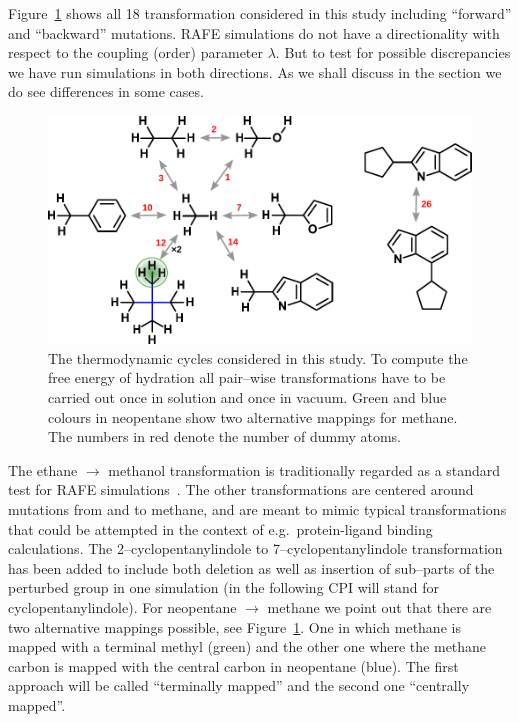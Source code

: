 \documentclass[journal=jctcce,manuscript=article]{achemso}
\begin{document}
Figure~\ref{fig:cycles} shows all 18 transformation considered in this
study including ``forward'' and ``backward'' mutations.  RAFE
simulations do not have a directionality with respect to the coupling (order) 
parameter $\lambda$.
But to test for possible discrepancies we have run 
simulations in both directions.  As we shall discuss in the 
 section we do see differences in some cases.
\begin{figure}[ht]
  \includegraphics[scale=1.0]{figures/cycles.pdf}
  \caption{The thermodynamic cycles considered in this study.  To
    compute the free energy of hydration all pair--wise
    transformations have to be carried out once in solution and once
    in vacuum.  Green and blue colours in neopentane show two
    alternative mappings for methane.  The numbers in red denote the
    number of dummy atoms.}
  \label{fig:cycles}
\end{figure}

The ethane $\rightarrow$ methanol transformation is traditionally
regarded as a standard test for RAFE
simulations~\cite{doi:10.1063/1.449208, doi:10.1021/jp981629f}.   The
other transformations are centered around mutations from and to
methane, and are meant to mimic typical transformations that could be attempted
in the context of e.g.\ protein-ligand binding calculations. The 
2--cyclopentanylindole to 7--cyclopentanylindole
transformation has been added to include both deletion as well as
insertion of sub--parts of the perturbed group in one simulation (in the 
following CPI will stand for cyclopentanylindole).  For
neopentane $\rightarrow$ methane we point out that there are two
alternative mappings possible, see Figure~\ref{fig:cycles}.  One in
which methane is mapped with a terminal methyl (green) and the other
one where the methane carbon is mapped with the central carbon in
neopentane (blue).  The first approach will be called ``terminally mapped'' and 
the second one ``centrally mapped''.
\end{document}
